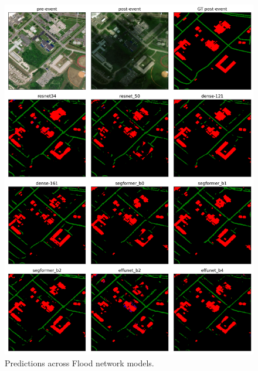 \documentclass[10pt,twocolumn,letterpaper]{article}
\begin{document}
\clearpage
\begin{figure}[t]
 \centering
  \includegraphics[width=2\linewidth]{final-report/figures/sample_images_flood_2.png}
  \caption{Predictions across Flood network models.}
  \label{fig:sample_images_flood_2}
\end{figure}
\end{document}
